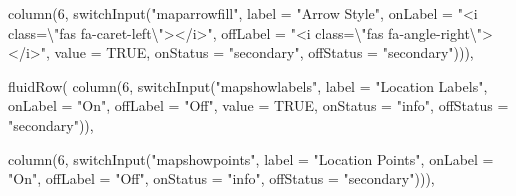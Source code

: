 \documentclass[
]{article}
\newenvironment{Shaded}{\begin{snugshade}}{\end{snugshade}}
\newcommand{\AttributeTok}[1]{\textcolor[rgb]{0.77,0.63,0.00}{#1}}
\newcommand{\ConstantTok}[1]{\textcolor[rgb]{0.00,0.00,0.00}{#1}}
\newcommand{\DecValTok}[1]{\textcolor[rgb]{0.00,0.00,0.81}{#1}}
\newcommand{\FunctionTok}[1]{\textcolor[rgb]{0.00,0.00,0.00}{#1}}
\newcommand{\NormalTok}[1]{#1}
\newcommand{\SpecialCharTok}[1]{\textcolor[rgb]{0.00,0.00,0.00}{#1}}
\newcommand{\StringTok}[1]{\textcolor[rgb]{0.31,0.60,0.02}{#1}}
\begin{document}
\begin{Shaded}
\begin{Highlighting}[]
                              \FunctionTok{column}\NormalTok{(}\DecValTok{6}\NormalTok{, }\FunctionTok{switchInput}\NormalTok{(}\StringTok{"maparrowfill"}\NormalTok{,}
                                                    \AttributeTok{label =} \StringTok{"Arrow Style"}\NormalTok{,}
                                                    \AttributeTok{onLabel =} \StringTok{"\textless{}i class=}\SpecialCharTok{\textbackslash{}"}\StringTok{fas fa{-}caret{-}left}\SpecialCharTok{\textbackslash{}"}\StringTok{\textgreater{}\textless{}/i\textgreater{}"}\NormalTok{,}
                                                    \AttributeTok{offLabel =} \StringTok{"\textless{}i class=}\SpecialCharTok{\textbackslash{}"}\StringTok{fas fa{-}angle{-}right}\SpecialCharTok{\textbackslash{}"}\StringTok{\textgreater{}\textless{}/i\textgreater{}"}\NormalTok{,}
                                                    \AttributeTok{value =} \ConstantTok{TRUE}\NormalTok{,}
                                                    \AttributeTok{onStatus =} \StringTok{"secondary"}\NormalTok{, }
                                                    \AttributeTok{offStatus =} \StringTok{"secondary"}\NormalTok{))),}
                            
                            \FunctionTok{fluidRow}\NormalTok{(}
                              \FunctionTok{column}\NormalTok{(}\DecValTok{6}\NormalTok{, }\FunctionTok{switchInput}\NormalTok{(}\StringTok{"mapshowlabels"}\NormalTok{,}
                                                    \AttributeTok{label =} \StringTok{"Location Labels"}\NormalTok{,}
                                                    \AttributeTok{onLabel =} \StringTok{"On"}\NormalTok{,}
                                                    \AttributeTok{offLabel =} \StringTok{"Off"}\NormalTok{,}
                                                    \AttributeTok{value =} \ConstantTok{TRUE}\NormalTok{,}
                                                    \AttributeTok{onStatus =} \StringTok{"info"}\NormalTok{, }
                                                    \AttributeTok{offStatus =} \StringTok{"secondary"}\NormalTok{)),}
                              
                              \FunctionTok{column}\NormalTok{(}\DecValTok{6}\NormalTok{, }\FunctionTok{switchInput}\NormalTok{(}\StringTok{"mapshowpoints"}\NormalTok{,}
                                                    \AttributeTok{label =} \StringTok{"Location Points"}\NormalTok{,}
                                                    \AttributeTok{onLabel =} \StringTok{"On"}\NormalTok{,}
                                                    \AttributeTok{offLabel =} \StringTok{"Off"}\NormalTok{,}
                                                    \AttributeTok{onStatus =} \StringTok{"info"}\NormalTok{, }
                                                    \AttributeTok{offStatus =} \StringTok{"secondary"}\NormalTok{))),}


\end{Highlighting}
\end{Shaded}
\end{document}
